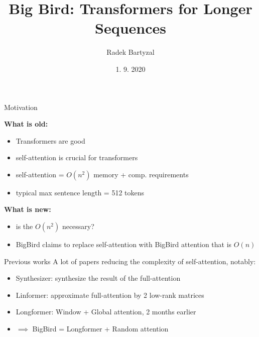 \documentclass{beamer}
\begin{document}
\title[BigBird]{Big Bird: Transformers for Longer Sequences}  
\author{Radek Bartyzal}
\date{1. 9. 2020} 

\frame{\titlepage} 

\begin{frame}{Motivation}

\textbf{What is old:}
\begin{itemize}
\item Transformers are good
\item self-attention is crucial for transformers
\item self-attention = $O(n^2)$ memory + comp. requirements
\item typical max sentence length = 512 tokens
\end{itemize}

\vfill

\textbf{What is new:}
\begin{itemize}
\item is the $O(n^2)$ necessary?
\item BigBird claims to replace self-attention with BigBird attention that is $O(n)$
\end{itemize}

\end{frame}
\begin{frame}{Previous works}
A lot of papers reducing the complexity of self-attention, notably:
\begin{itemize}
\item Synthesizer: synthesize the result of the full-attention
\item Linformer: approximate full-attention by 2 low-rank matrices
\item Longformer: Window + Global attention, 2 months earlier
\item $\implies$ BigBird = Longformer + Random attention
\end{itemize}
\end{frame}
\end{document}
